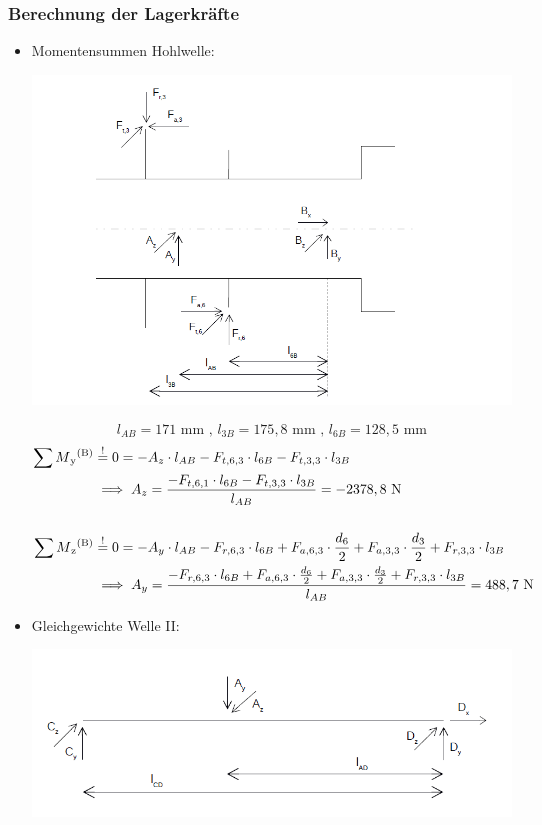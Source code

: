 \subsubsection{Berechnung der Lagerkräfte}
\begin{itemize}
	\item Momentensummen Hohlwelle:
	\begin{center}
		\includegraphics[width=1.2\textwidth,keepaspectratio]{figures/Gang3Hohl.png}
	\end{center}
\[l_{AB} =171\text{ mm} \text{ , } l_{3B} = 175,8\text{ mm} \text{ , } l_{6B} = 128,5\text{ mm}  \]
	\begin{align*}
	\sum M\textsubscript{y}\textsuperscript{(B)} &\overset{!}{=} 0 = -A_z \cdot l_{AB} - F_{t,6,3} \cdot l_{6B} - F_{t,3,3} \cdot l_{3B} \\
	&\implies A_z =  \frac{-F_{t,6,1} \cdot l_{6B} - F_{t,3,3} \cdot l_{3B}}{l_{AB}} = -2378,8\text{ N} \\ \\
	\sum M\textsubscript{z}\textsuperscript{(B)} &\overset{!}{=} 0 = -A_y \cdot l_{AB} - F_{r,6,3} \cdot l_{6B} + F_{a,6,3} \cdot \frac{d_6}{2} + F_{a,3,3} \cdot \frac{d_3}{2} + F_{r,3,3} \cdot l_{3B}\\
	&\implies A_y = \frac{-F_{r,6,3} \cdot l_{6B} + F_{a,6,3} \cdot \frac{d_6}{2} +F_{a,3,3} \cdot \frac{d_3}{2} + F_{r,3,3} \cdot l_{3B}} {l_{AB}}= 488,7 \text{ N} 
	\end{align*}
	\item Gleichgewichte Welle II:
	\begin{center}
		\includegraphics[width=1.04\textwidth,keepaspectratio]{figures/Gang3.png}

\end{center}
\end{itemize}
